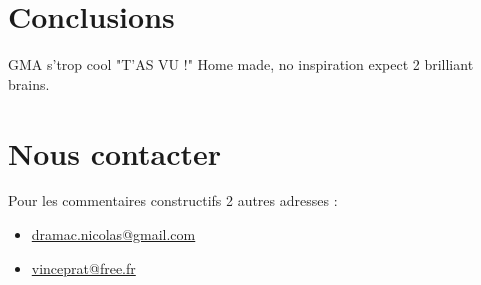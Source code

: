 \documentclass[a4paper,12pt]{article}
\begin{document}
\section{Conclusions}\label{conclusions}
GMA s'trop cool "T'AS VU !"
Home made, no inspiration expect 2 brilliant brains.

\section*{Nous contacter}
Pour les commentaires constructifs 2 autres adresses :
\begin{itemize}
    \item \href{mailto:dramac.nicolas@gmail.com}{dramac.nicolas@gmail.com}
    \item \href{mailto:vinceprat@free.fr}{vinceprat@free.fr}
\end{itemize}
\end{document}

